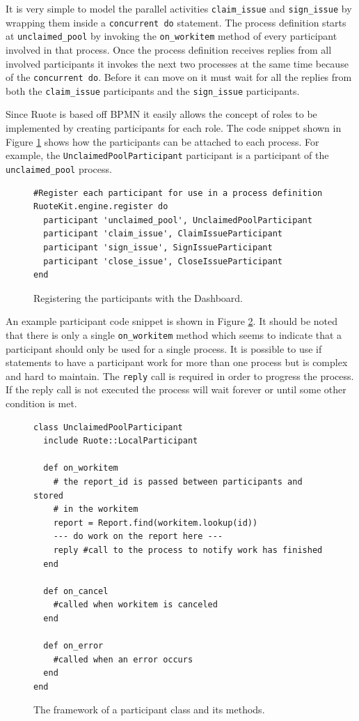 \documentclass[document.tex]{subfiles}
\begin{document}
It is very simple to model the parallel activities \verb!claim_issue! and \verb!sign_issue! by wrapping them inside a \verb!concurrent do! statement. The process definition starts at \verb!unclaimed_pool! by invoking the \verb!on_workitem! method of every participant involved in that process. Once the process definition receives replies from all involved participants it invokes the next two processes at the same time because of the \verb!concurrent do!. Before it can move on it must wait for all the replies from both the \verb!claim_issue! participants and the \verb!sign_issue! participants.

Since Ruote is based off BPMN it easily allows the concept of roles to be implemented by creating participants for each role. The code snippet shown in Figure \ref{fig:ruote-prototype-participant-register} shows how the participants can be attached to each process. For example, the \verb!UnclaimedPoolParticipant! participant is a participant of the \verb!unclaimed_pool! process.

\begin{figure}[!ht]
  \begin{lstlisting}
#Register each participant for use in a process definition
RuoteKit.engine.register do
  participant 'unclaimed_pool', UnclaimedPoolParticipant
  participant 'claim_issue', ClaimIssueParticipant
  participant 'sign_issue', SignIssueParticipant
  participant 'close_issue', CloseIssueParticipant
end
  \end{lstlisting}
  \caption{Registering the participants with the Dashboard.}
  \label{fig:ruote-prototype-participant-register}
\end{figure}

An example participant code snippet is shown in Figure \ref{fig:ruote-prototype-participant-code}. It should be noted that there is only a single \verb!on_workitem! method which seems to indicate that a participant should only be used for a single process. It is possible to use if statements to have a participant work for more than one process but is complex and hard to maintain. The \verb!reply! call is required in order to progress the process. If the reply call is not executed the process will wait forever or until some other condition is met.

\begin{figure}[!ht]
  \begin{lstlisting}
class UnclaimedPoolParticipant
  include Ruote::LocalParticipant

  def on_workitem
    # the report_id is passed between participants and stored
    # in the workitem
    report = Report.find(workitem.lookup(id))
    --- do work on the report here ---
    reply #call to the process to notify work has finished
  end

  def on_cancel
    #called when workitem is canceled
  end

  def on_error
    #called when an error occurs
  end
end
  \end{lstlisting}
  \caption{The framework of a participant class and its methods.}
  \label{fig:ruote-prototype-participant-code}
\end{figure}
\end{document}

